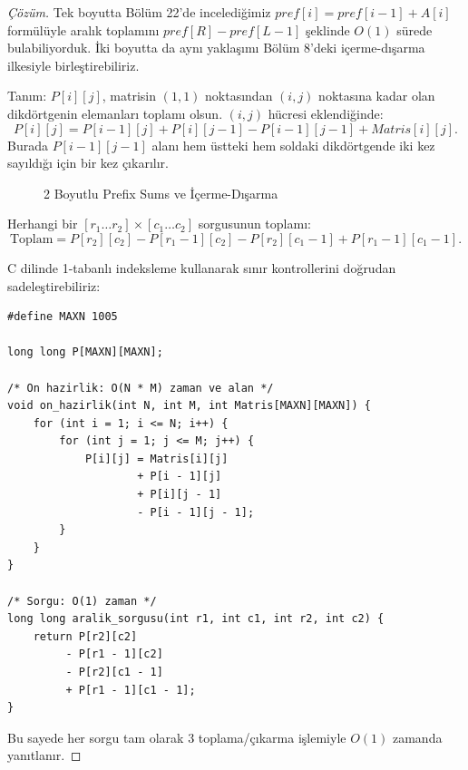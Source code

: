 \begin{proof}[Çözüm]
Tek boyutta Bölüm 22'de incelediğimiz $pref[i] = pref[i-1] + A[i]$ formülüyle aralık toplamını $pref[R] - pref[L-1]$ şeklinde $O(1)$ sürede bulabiliyorduk. İki boyutta da aynı yaklaşımı Bölüm 8'deki içerme-dışarma ilkesiyle birleştirebiliriz.

Tanım: $P[i][j]$, matrisin $(1,1)$ noktasından $(i,j)$ noktasına kadar olan dikdörtgenin elemanları toplamı olsun.
$(i,j)$ hücresi eklendiğinde:
\[
P[i][j] = P[i-1][j] + P[i][j-1] - P[i-1][j-1] + Matris[i][j].
\]
Burada $P[i-1][j-1]$ alanı hem üstteki hem soldaki dikdörtgende iki kez sayıldığı için bir kez çıkarılır.

\begin{figure}[htbp]
\centering
{}
\caption{2 Boyutlu Prefix Sums ve İçerme-Dışarma}
\end{figure}

Herhangi bir $[r_1 \dots r_2] \times [c_1 \dots c_2]$ sorgusunun toplamı:
\[
\text{Toplam} = P[r_2][c_2] - P[r_1 - 1][c_2] - P[r_2][c_1 - 1] + P[r_1 - 1][c_1 - 1].
\]

C dilinde 1-tabanlı indeksleme kullanarak sınır kontrollerini doğrudan sadeleştirebiliriz:

\begin{lstlisting}[language=CTemel]
#define MAXN 1005

long long P[MAXN][MAXN];

/* On hazirlik: O(N * M) zaman ve alan */
void on_hazirlik(int N, int M, int Matris[MAXN][MAXN]) {
    for (int i = 1; i <= N; i++) {
        for (int j = 1; j <= M; j++) {
            P[i][j] = Matris[i][j] 
                    + P[i - 1][j] 
                    + P[i][j - 1] 
                    - P[i - 1][j - 1];
        }
    }
}

/* Sorgu: O(1) zaman */
long long aralik_sorgusu(int r1, int c1, int r2, int c2) {
    return P[r2][c2] 
         - P[r1 - 1][c2] 
         - P[r2][c1 - 1] 
         + P[r1 - 1][c1 - 1];
}
\end{lstlisting}
Bu sayede her sorgu tam olarak 3 toplama/çıkarma işlemiyle $O(1)$ zamanda yanıtlanır.
\end{proof}

